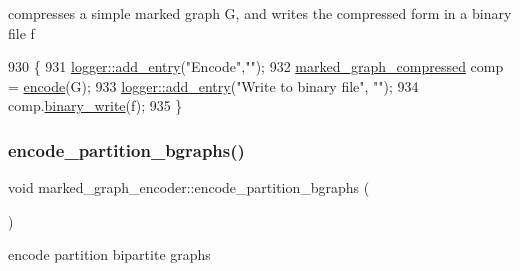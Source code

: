 compresses a simple marked graph G, and writes the compressed form in a binary file f 


\begin{DoxyCode}
930                                                                \{
931   \hyperlink{classlogger_a710163deb17bc81f70d53d285b8ac9ac}{logger::add\_entry}(\textcolor{stringliteral}{"Encode"},\textcolor{stringliteral}{""});
932   \hyperlink{classmarked__graph__compressed}{marked\_graph\_compressed} comp = \hyperlink{classmarked__graph__encoder_aa7fa19a225dd9b31d6fef9583fab8cf1}{encode}(G);
933   \hyperlink{classlogger_a710163deb17bc81f70d53d285b8ac9ac}{logger::add\_entry}(\textcolor{stringliteral}{"Write to binary file"}, \textcolor{stringliteral}{""});
934   comp.\hyperlink{classmarked__graph__compressed_ab9cdb7fc43badd58fb5202f74ffac723}{binary\_write}(f);
935 \}
\end{DoxyCode}
\mbox{\label{classmarked__graph__encoder_aa113c4870e3221faa332b2151b63d9e6}} 
\subsubsection{\texorpdfstring{encode\+\_\+partition\+\_\+bgraphs()}{encode\_partition\_bgraphs()}}
{\footnotesize\ttfamily void marked\+\_\+graph\+\_\+encoder\+::encode\+\_\+partition\+\_\+bgraphs (\begin{DoxyParamCaption}{ }\end{DoxyParamCaption})\hspace{0.3cm}{\ttfamily [private]}}



encode partition bipartite graphs 


